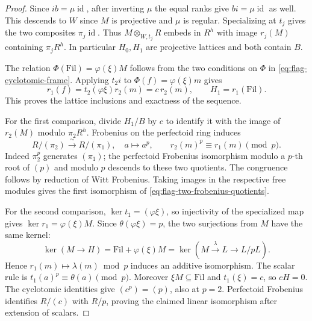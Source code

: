 \begin{proof}
Since \(ib=\mu\operatorname{id}\), after inverting \(\mu\) the equal ranks give \(bi=\mu\operatorname{id}\) as well. This descends to \(W\) since \(M\) is projective and \(\mu\) is regular. Specializing at \(t_j\) gives the two composites \(\pi_j\operatorname{id}\). Thus \(M\otimes_{W,t_j}R\) embeds in \(R^h\) with image \(r_j(M)\) containing \(\pi_j R^h\). In particular \(H_0,H_1\) are projective lattices and both contain \(B\).

The relation \(\Phi(\mathrm{Fil})=\varphi(\xi)M\) follows from the two conditions on \(\Phi\) in \eqref{eq:flag-cyclotomic-frame}. Applying \(t_2 i\) to \(\Phi(f)=\varphi(\xi)m\) gives
\[
 r_1(f)=t_2(\varphi\xi)r_2(m)=c\,r_2(m),\qquad
 H_1=r_1(\mathrm{Fil}).
\]
This proves the lattice inclusions and exactness of the sequence.

For the first comparison, divide \(H_1/B\) by \(c\) to identify it with the image of \(r_2(M)\) modulo \(\pi_2 R^h\). Frobenius on the perfectoid ring induces
\[
 R/(\pi_2)\xrightarrow{\ \sim\ } R/(\pi_1),\quad a\mapsto a^p,
 \qquad r_2(m)^p\equiv r_1(m)\pmod p .
\]
Indeed \(\pi_2^p\) generates \((\pi_1)\); the perfectoid Frobenius isomorphism modulo a \(p\)-th root of \((p)\) and modulo \(p\) descends to these two quotients. The congruence follows by reduction of Witt Frobenius. Taking images in the respective free modules gives the first isomorphism of \eqref{eq:flag-two-frobenius-quotients}.

For the second comparison, \(\ker t_1=(\varphi\xi)\), so injectivity of the specialized map gives \(\ker r_1=\varphi(\xi)M\). Since \(\theta(\varphi\xi)=p\), the two surjections from \(M\) have the same kernel:
\[
 \ker(M\longrightarrow H)=\mathrm{Fil}+\varphi(\xi)M
          =\ker(M\xrightarrow{\lambda}L\longrightarrow L/pL).
\]
Hence \(r_1(m)\mapsto\lambda(m)\bmod p\) induces an additive isomorphism. The scalar rule is \(t_1(a)^p\equiv\theta(a)\pmod p\). Moreover \(\xi M\subseteq\mathrm{Fil}\) and \(t_1(\xi)=c\), so \(cH=0\). The cyclotomic identities give \((c^p)=(p)\), also at \(p=2\). Perfectoid Frobenius identifies \(R/(c)\) with \(R/p\), proving the claimed linear isomorphism after extension of scalars.
\end{proof}

